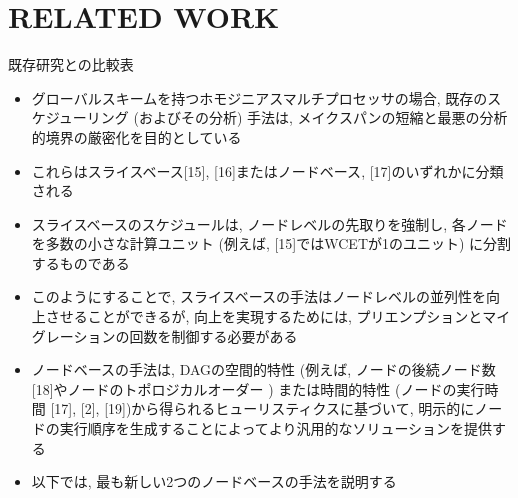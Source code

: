 
\section{RELATED WORK}
\label{sec: rw}

\begin{frame}{既存研究との比較表}
\end{frame}

\begin{frame}{}
    \begin{itemize}
        \item グローバルスキームを持つホモジニアスマルチプロセッサの場合, 既存のスケジューリング (およびその分析) 手法は, メイクスパンの短縮と最悪の分析的境界の厳密化を目的としている
        \item これらはスライスベース[15], [16]またはノードベース\cite{he2019intra}, [17]のいずれかに分類される
        \item スライスベースのスケジュールは, ノードレベルの先取りを強制し, 各ノードを多数の小さな計算ユニット (例えば, [15]ではWCETが1のユニット) に分割するものである
        \item このようにすることで, スライスベースの手法はノードレベルの並列性を向上させることができるが, 向上を実現するためには, プリエンプションとマイグレーションの回数を制御する必要がある
    \end{itemize}
\end{frame}

\begin{frame}{}
    \begin{itemize}
        \item ノードベースの手法は, DAGの空間的特性 (例えば, ノードの後続ノード数 [18]やノードのトポロジカルオーダー \cite{he2019intra}) または時間的特性 (ノードの実行時間 [17], [2], [19])から得られるヒューリスティクスに基づいて, 明示的にノードの実行順序を生成することによってより汎用的なソリューションを提供する
        \item 以下では, 最も新しい2つのノードベースの手法を説明する
    \end{itemize}
\end{frame}


